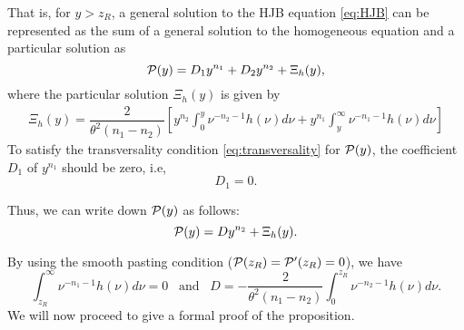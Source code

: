 \documentclass[a4paper,report, 11pt]{article}
\def\t{\theta}
\def\be{\begin{eqnarray}}
\def\ee{\end{eqnarray}}
\begin{document}
	That is, for $y>z_R$, a general solution to the HJB equation \eqref{eq:HJB} can be represented as the sum of a general solution to the homogeneous equation and a particular solution as 
	\begin{equation*}
		{\cal P}(y) = D_1y^{n_1}+D_2y^{n_2} +\Xi_{h} (y),
	\end{equation*}
	where the particular solution $\Xi_h(y)$ is given by 
	\be\label{particular_solution}
	\Xi_h(y)=\dfrac{2}{\t^2(n_1-n_2)}\left[y^{n_2}\int_0^{y}\nu^{-n_2-1}{h}(\nu)d\nu +y^{n_1}\int_y^\infty \nu^{-n_1-1}{h}(\nu)d\nu\right]
	\ee
	To satisfy the transversality condition \eqref{eq:transversality} for ${\cal P}(y)$, the coefficient $D_1$ of $y^{n_1}$ should be zero, i.e, 
	$$
	D_1= 0. 
	$$
	
	Thus, we can write down ${\cal P}(y)$ as follows: 
	\begin{equation*}
		{\cal P}(y) = Dy^{n_2} +\Xi_h(y). 
	\end{equation*}
	
	
	By using the smooth pasting condition (${\cal P}(z_R)={\cal P}'(z_R)=0$), we have 
	\begin{equation*}
		\int_{z_R}^\infty \nu^{-n_1-1}{h}(\nu)d\nu =0\;\;\;\mbox{and}\;\;\;D=-\dfrac{2}{\t^2(n_1-n_2)}\int_0^{z_R}\nu^{-n_2-1}{h}(\nu)d\nu. 
	\end{equation*}
We will now proceed to give a formal proof of the proposition. 
\end{document}
